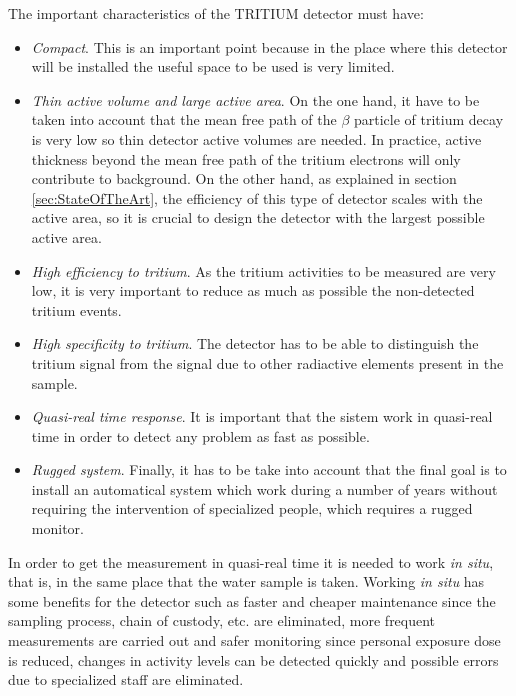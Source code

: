 The important characteristics of the TRITIUM detector must have:

\begin{itemize}

\item{} \textit{Compact}. This is an important point because in the place where this detector will be installed the useful space to be used is very limited.

\item{} \textit{Thin active volume and large active area}. On the one hand, it have to be taken into account that the mean free path of the $\beta$ particle of tritium decay is very low so thin detector active volumes are needed. In practice, active thickness beyond the mean free path of the tritium electrons will only contribute to background. On the other hand, as explained in section \ref{sec:StateOfTheArt}, the efficiency of this type of detector scales with the active area, so it is crucial to design the detector with the largest possible active area.

\item{} \textit{High efficiency to tritium}. As the tritium activities to be measured are very low, it is very important to reduce as much as possible the non-detected tritium events.

\item{} \textit{High specificity to tritium}. The detector has to be able to distinguish the tritium signal from the signal due to other radiactive elements present in the sample.

\item{} \textit{Quasi-real time response}. It is important that the sistem work in quasi-real time in order to detect any problem as fast as possible. 

\item{} \textit{Rugged system}. Finally, it has to be take into account that the final goal is to install an automatical system which work during a number of years without requiring the intervention of specialized people, which requires a rugged monitor. 

\end{itemize}

In order to get the measurement in quasi-real time it is needed to work \textit{in situ}, that is, in the same place that the water sample is taken. Working \textit{in situ} has some benefits for the detector such as faster and cheaper maintenance since the sampling process, chain of custody, etc. are eliminated, more frequent measurements are carried out and safer monitoring since personal exposure dose is reduced, changes in activity levels can be detected quickly and possible errors due to specialized staff are eliminated.


